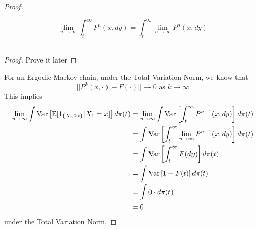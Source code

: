 \begin{theorem}
\begin{proof}
\begin{equation*}
        \end{equation*}
        \begin{lem}
            $$\lim_{n \rightarrow \infty} \int_t^{\infty} P^{n}(x, dy) = \int_t^{\infty} \lim_{n \rightarrow \infty} P^{n}(x, dy)$$\
            \begin{proof}
                Prove it later
            \end{proof}
        \end{lem}
        For an Ergodic Markov chain, under the Total Variation Norm, we know that
        \begin{equation*}
            ||P^k(x, \cdot) - F(\cdot)|| \rightarrow 0 \text{ as } k \rightarrow \infty
        \end{equation*}
        This implies
        \begin{align*}
            \lim_{n \rightarrow \infty} \int \text{Var}\left[{{\mathbb{E}[1_{\{X_{n} \geq t\}}|X_1=x]}}\right] d\pi(t) &= \lim_{n \rightarrow \infty} \int \text{Var}\left[{{\int_t^{\infty} P^{n-1}(x, dy)}}\right] d\pi(t)\\
            &= \int \text{Var}\left[{{\int_t^{\infty} \lim_{n \rightarrow \infty} P^{n-1}(x, dy)}}\right] d\pi(t)\\
            &= \int \text{Var}\left[{{\int_t^{\infty} F(dy)}}\right] d\pi(t)\\
            &= \int \text{Var}\left[{{1-F(t)}}\right] d\pi(t)\\
            &= \int 0 \cdot d\pi(t)\\
            &= 0
        \end{align*}
        under the Total Variation Norm.
    \end{proof}
\end{theorem}
